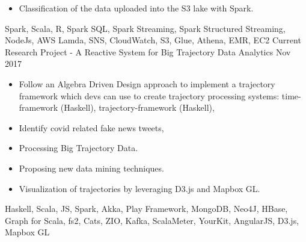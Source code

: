 \begin{experiences}
{\begin{itemize}
        \item Classification of the data uploaded into the S3 lake with Spark.
      \end{itemize}
    }{Spark, Scala, R, Spark SQL, Spark Streaming, Spark Structured Streaming, NodeJs, AWS Lamda, SNS, CloudWatch, S3, Glue, Athena, EMR, EC2}
  \emptySeparator
  \experience
    {Current} {Research Project - A Reactive System for Big Trajectory Data Analytics}
    {Nov 2017}{
      \begin{itemize}
        \item Follow an Algebra Driven Design approach to implement a trajectory framework which devs can use to create trajectory processing systems: time-framework (Haskell), trajectory-framework (Haskell),
        \item Identify covid related fake news tweets,
        \item	Processing Big Trajectory Data.
        \item	Proposing new data mining techniques.
        \item	Visualization of trajectories by leveraging D3.js and Mapbox GL.                                
      \end{itemize}
    }{Haskell, Scala, JS, Spark, Akka, Play Framework, MongoDB, Neo4J, HBase, Graph for Scala, fs2, Cats, ZIO, Kafka, ScalaMeter, YourKit, AngularJS, D3.js, Mapbox GL}
  \emptySeparator
\end{experiences}